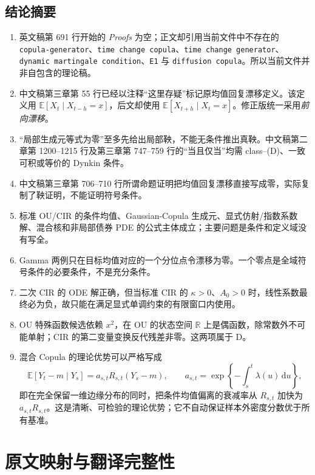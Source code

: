 \documentclass[UTF8,11pt]{ctexart}
\newcommand{\E}{\mathbb E}
\newcommand{\R}{\mathbb R}
\newcommand{\dd}{\,\mathrm d}
\begin{document}
\subsection{结论摘要}

\begin{enumerate}[label=\textbf{K\arabic*.}]
  \item 英文稿第 691 行开始的 \emph{Proofs} 为空；正文却引用当前文件中不存在的
  \texttt{copula-generator}、\texttt{time change copula}、\texttt{time change generator}、
  \texttt{dynamic martingale condition}、\texttt{E1} 与 \texttt{diffusion copula}。所以当前文件并非自包含的理论稿。
  \item 中文稿第三章第 55 行已经以注释“这里存疑”标记原均值回复漂移定义。该定义用
  $\E[X_t\mid X_{t-h}=x]$，后文却使用 $\E[X_{t+h}\mid X_t=x]$。修正版统一采用\emph{前向漂移}。
  \item “局部生成元等式为零”至多先给出局部鞅，不能无条件推出真鞅。中文稿第二章第 1200--1215 行及第三章第 747--759 行的“当且仅当”均需 class--(D)、一致可积或等价的 Dynkin 条件。
  \item 中文稿第三章第 706--710 行所谓命题证明把均值回复漂移直接写成零，实际复制了鞅证明，不能证明符号条件。
  \item 标准 OU/CIR 的条件均值、Gaussian-Copula 生成元、显式仿射/指数系数解、混合核和非局部债券 PDE 的公式主体成立；主要问题是条件和定义域没有写全。
  \item Gamma 两例只在目标均值对应的一个分位点令漂移为零。一个零点是全域符号条件的必要条件，不是充分条件。
  \item 二次 CIR 的 ODE 解正确，但当标准 CIR 的 $\kappa>0$、$A_0>0$ 时，线性系数最终必为负，故只能在满足显式单调约束的有限窗口内使用。
  \item OU 特殊函数候选依赖 $x^2$，在 OU 的状态空间 $\R$ 上是偶函数，除常数外不可能单射；CIR 的第二变量变换反代残差非零。这两项属于 D。
  \item 混合 Copula 的理论优势可以严格写成
  \[
    \E[Y_t-m\mid Y_s]
      =a_{s,t}R_{s,t}(Y_s-m),
    \qquad
    a_{s,t}=\exp\!\left\{-\int_s^t\lambda(u)\dd u\right\},
  \]
  即在完全保留一维边缘分布的同时，把条件均值偏离的衰减率从 $R_{s,t}$ 加快为 $a_{s,t}R_{s,t}$。这是清晰、可检验的理论优势；它不自动保证样本外密度分数优于所有基准。
\end{enumerate}

\section{原文映射与翻译完整性}
\end{document}
